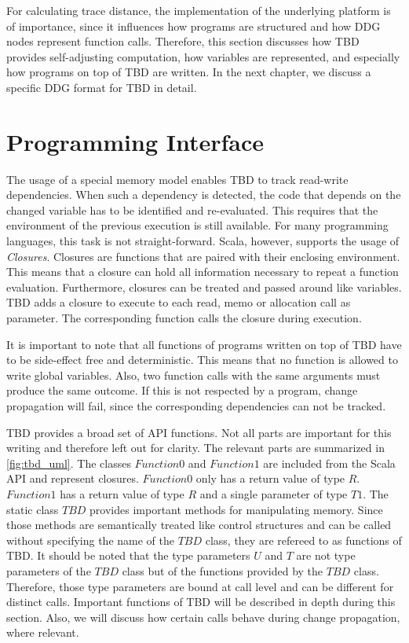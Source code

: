For calculating trace distance, the implementation of the underlying platform is of importance, since it influences how programs are structured and how DDG nodes represent function calls. Therefore, this section discusses how TBD provides self-adjusting computation, how variables are represented, and especially how programs on top of TBD are written. In the next chapter, we discuss a specific DDG format for TBD in detail. 

\section{Programming Interface}

The usage of a special memory model enables TBD to track read-write dependencies. When such a dependency is detected, the code that depends on the changed variable has to be identified and re-evaluated. This requires that the environment of the previous execution is still available. For many programming languages, this task is not straight-forward. Scala, however, supports the usage of \textit{Closures}. Closures are functions that are paired with their enclosing environment. This means that a closure can hold all information necessary to repeat a function evaluation. Furthermore, closures can be treated and passed around like variables. TBD adds a closure to execute to each read, memo or allocation call as parameter. The corresponding function calls the closure during execution. 

It is important to note that all functions of programs written on top of TBD have to be side-effect free and deterministic. This means that no function is allowed to write global variables. Also, two function calls with the same arguments must produce the same outcome. If this is not respected by a program, change propagation will fail, since the corresponding dependencies can not be tracked. 

TBD provides a broad set of API functions. Not all parts are important for this writing and therefore left out for clarity. The relevant parts are summarized in \ref{fig:tbd_uml}. The classes $Function0$ and $Function1$ are included from the Scala API and represent closures. $Function0$ only has a return value of type $R$. $Function1$ has a return value of type $R$ and a single parameter of type $T1$. The static class $TBD$ provides important methods for manipulating memory. Since those methods are semantically treated like control structures and can be called without specifying the name of the $TBD$ class, they are refereed to as functions of TBD. It should be noted that the type parameters $U$ and $T$ are not type parameters of the $TBD$ class but of the functions provided by the $TBD$ class. Therefore, those type parameters are bound at call level and can be different for distinct calls. Important functions of TBD will be described in depth during this section. Also, we will discuss how certain calls behave during change propagation, where relevant. 

